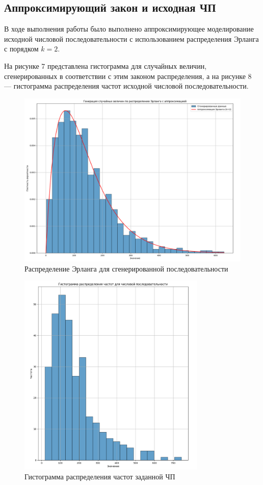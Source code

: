 \subsection{Аппроксимирующий закон и исходная ЧП}

В ходе выполнения работы было выполнено аппроксимирующее моделирование исходной числовой последовательности с использованием распределения Эрланга с порядком \( k = 2 \).

На рисунке 7 представлена гистограмма для случайных величин, сгенерированных в соответствии с этим законом распределения, а на рисунке 8 — гистограмма распределения частот исходной числовой последовательности.

\begin{figure}[H]
	\centering
	\includegraphics[width=1\textwidth]{../data/histogram_random_generated.png}
	\caption{Распределение Эрланга для сгенерированной последовательности}
\end{figure}

\begin{figure}[H]
	\centering
	\includegraphics[width=0.8\textwidth]{../data/histogram.png}
	\caption{Гистограмма распределения частот заданной ЧП}
\end{figure}

